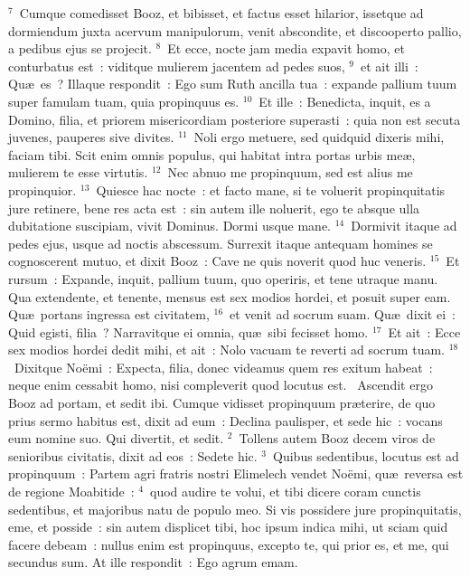${}^{7}$~Cumque comedisset Booz, et bibisset, et factus esset hilarior, issetque ad dormiendum juxta acervum manipulorum, venit abscondite, et discooperto pallio, a pedibus ejus se projecit.
${}^{8}$~Et ecce, nocte jam media expavit homo, et conturbatus est~: viditque mulierem jacentem ad pedes suos,
${}^{9}$~et ait illi~: Qu\ae\ es~? Illaque respondit~: Ego sum Ruth ancilla tua~: expande pallium tuum super famulam tuam, quia propinquus es.
${}^{10}$~Et ille~: Benedicta, inquit, es a Domino, filia, et priorem misericordiam posteriore superasti~: quia non est secuta juvenes, pauperes sive divites.
${}^{11}$~Noli ergo metuere, sed quidquid dixeris mihi, faciam tibi. Scit enim omnis populus, qui habitat intra portas urbis me\ae , mulierem te esse virtutis.
${}^{12}$~Nec abnuo me propinquum, sed est alius me propinquior.
${}^{13}$~Quiesce hac nocte~: et facto mane, si te voluerit propinquitatis jure retinere, bene res acta est~: sin autem ille noluerit, ego te absque ulla dubitatione suscipiam, vivit Dominus. Dormi usque mane.
${}^{14}$~Dormivit itaque ad pedes ejus, usque ad noctis abscessum. Surrexit itaque antequam homines se cognoscerent mutuo, et dixit Booz~: Cave ne quis noverit quod huc veneris.
${}^{15}$~Et rursum~: Expande, inquit, pallium tuum, quo operiris, et tene utraque manu. Qua extendente, et tenente, mensus est sex modios hordei, et posuit super eam. Qu\ae\ portans ingressa est civitatem,
${}^{16}$~et venit ad socrum suam. Qu\ae\ dixit ei~: Quid egisti, filia~? Narravitque ei omnia, qu\ae\ sibi fecisset homo.
${}^{17}$~Et ait~: Ecce sex modios hordei dedit mihi, et ait~: Nolo vacuam te reverti ad socrum tuam.
${}^{18}$~Dixitque No\"emi~: Expecta, filia, donec videamus quem res exitum habeat~: neque enim cessabit homo, nisi compleverit quod locutus est.
~Ascendit ergo Booz ad portam, et sedit ibi. Cumque vidisset propinquum pr\ae terire, de quo prius sermo habitus est, dixit ad eum~: Declina paulisper, et sede hic~: vocans eum nomine suo. Qui divertit, et sedit.
${}^{2}$~Tollens autem Booz decem viros de senioribus civitatis, dixit ad eos~: Sedete hic.
${}^{3}$~Quibus sedentibus, locutus est ad propinquum~: Partem agri fratris nostri Elimelech vendet No\"emi, qu\ae\ reversa est de regione Moabitide~:
${}^{4}$~quod audire te volui, et tibi dicere coram cunctis sedentibus, et majoribus natu de populo meo. Si vis possidere jure propinquitatis, eme, et posside~: sin autem displicet tibi, hoc ipsum indica mihi, ut sciam quid facere debeam~: nullus enim est propinquus, excepto te, qui prior es, et me, qui secundus sum. At ille respondit~: Ego agrum emam.
